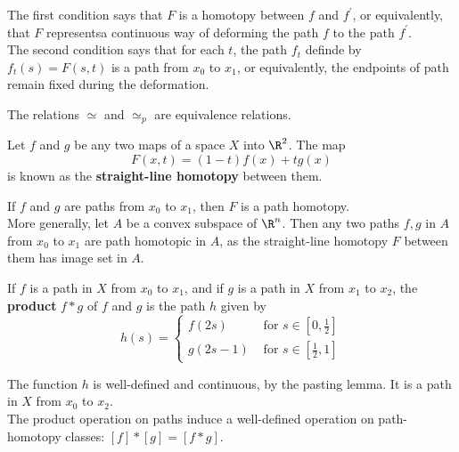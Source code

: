 \begin{remark}
The first condition says that $F$ is a homotopy between $f$ and $f^{\prime}$, or equivalently, that $F$ representsa continuous way of deforming the path $f$ to the path $f^{\prime}$. \\

The second condition says that for each $t$, the path $f_t$ definde by $f_t(s) = F(s, t)$ is a path from $x_0$ to $x_1$, or equivalently, the endpoints of path remain fixed during the deformation.
\end{remark}

\begin{lemma}
The relations $\simeq$ and $\simeq_p$ are equivalence relations.
\end{lemma}

\begin{eg}
Let $f$ and $g$ be any two maps of a space $X$ into $\R^2$. The map 
\[
    F(x, t) = (1-t) f(x) + tg(x)
\]
is known as the \textbf{straight-line homotopy} between them.
\end{eg}

\begin{remark}
If $f$ and $g$ are paths from $x_0$ to $x_1$, then $F$ is a path homotopy. \\

More generally, let $A$ be a convex subspace of $\R^n$. Then any two paths $f, g$ in $A$ from $x_0$ to $x_1$ are path homotopic in $A$, as
the straight-line homotopy $F$ between them has image set in $A$.
\end{remark}

\begin{definition}[Product]
If $f$ is a path in $X$ from $x_0$ to $x_1$, and if $g$ is a path in $X$ from $x_1$ to $x_2$, the \textbf{product} $f * g$ of $f$ and $g$ is the path $h$ given by
\[
    h(s) = \begin{cases}
        f(2s) &\text{ for } s \in \left[ 0, \frac{1}{2} \right] \\
        g(2s - 1) &\text{ for } s \in \left[ \frac{1}{2}, 1 \right]
    \end{cases}
\]
\end{definition}

\begin{remark}
The function $h$ is well-defined and continuous, by the pasting lemma. It is a path in $X$ from $x_0$ to $x_2$. \\

The product operation on paths induce a well-defined operation on path-homotopy classes: $[f] * [g] = [f*g]$.
\end{remark}

